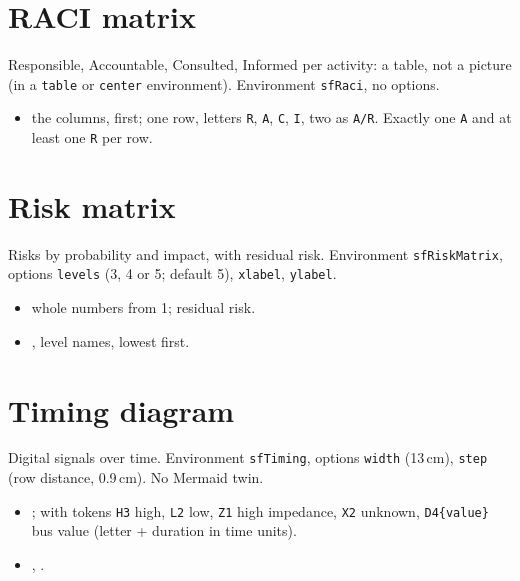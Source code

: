 
\section{RACI matrix}

Responsible, Accountable, Consulted, Informed per activity: a table, not a picture (in a \texttt{table} or \texttt{center} environment). Environment \texttt{sfRaci}, no options.

\begin{itemize}
  \item {} the columns, first;  one row, letters \texttt{R}, \texttt{A}, \texttt{C}, \texttt{I}, two as \texttt{A/R}. Exactly one \texttt{A} and at least one \texttt{R} per row.
\end{itemize}


\section{Risk matrix}

Risks by probability and impact, with residual risk. Environment \texttt{sfRiskMatrix}, options \texttt{levels} (3, 4 or 5; default 5), \texttt{xlabel}, \texttt{ylabel}.

\begin{itemize}
  \item {} whole numbers from 1;  residual risk.
  \item {},  level names, lowest first.
\end{itemize}


\section{Timing diagram}

Digital signals over time. Environment \texttt{sfTiming}, options \texttt{width} (13\,cm), \texttt{step} (row distance, 0.9\,cm). No Mermaid twin.

\begin{itemize}
  \item {};  with tokens \texttt{H3} high, \texttt{L2} low, \texttt{Z1} high impedance, \texttt{X2} unknown, \texttt{D4\{value\}} bus value (letter + duration in time units).
  \item {}, .
\end{itemize}

